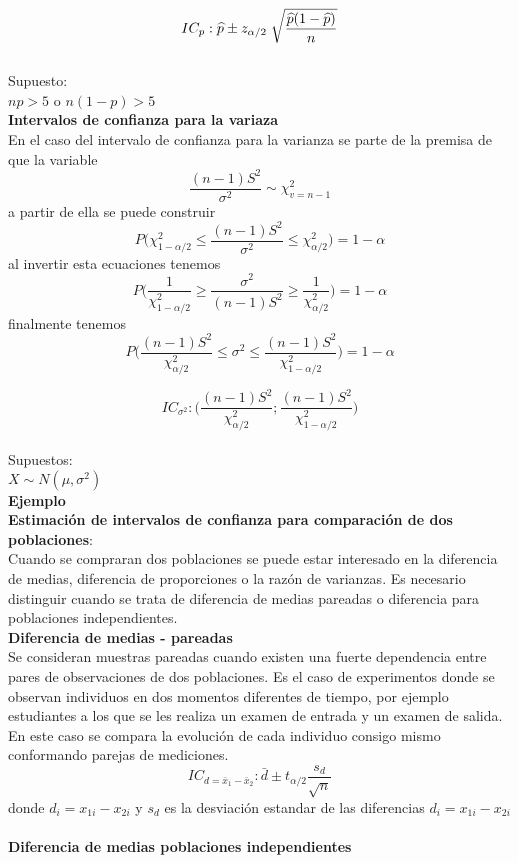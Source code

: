 \documentclass[base=hide,12pt]{elegantbook}
\begin{document}
			$$IC_{p}: \widehat{p} \pm z_{\alpha/2} \hspace{.1cm}\sqrt{\frac{\widehat{p}(1-\widehat{p})}{n}} $$
			\\
			Supuesto:\\
			$np>5$ o $n(1-p)>5$\\
			

	
\textcolor{col4}{\bf \large Intervalos de confianza para la variaza}\\
	En el caso del intervalo de confianza para la varianza se parte de la premisa de que la variable
	$$\frac{(n-1)S^{2}}{\sigma^{2}} \sim \chi^{2}_{v=n-1}$$
	a partir de ella se puede construir
	$$P\Bigg(\chi^{2}_{1-\alpha/2} \leq \frac{(n-1)S^{2}}{\sigma^{2}} \leq \chi^{2}_{\alpha/2} \Bigg)=1-\alpha$$
	al invertir esta ecuaciones tenemos
	$$P\Bigg(\frac{1}{\chi^{2}_{1-\alpha/2}} \geq \frac{\sigma^{2}}{(n-1)S^{2}} \geq \frac{1}{\chi^{2}_{\alpha/2}} \Bigg)=1-\alpha$$
	finalmente tenemos
	$$P\Bigg( \frac{(n-1)S^{2}}{\chi^{2}_{\alpha/2}} \leq \sigma^{2} \leq \frac{(n-1)S^{2}}{\chi^{2}_{1-\alpha/2}} \Bigg)=1-\alpha$$
	

			$$IC_{\sigma^{2}}: \Bigg( \displaystyle\frac{(n-1)S^{2}}{\chi^{2}_{\alpha/2}} ;\displaystyle\frac{(n-1)S^{2}}{\chi^{2}_{1-\alpha/2}} \Bigg)$$
			\\
			Supuestos:\\
			$X\sim N(\mu,\sigma^{2})$\\
			
\textcolor{col1}{\bf Ejemplo}\\	
	
\textcolor{col4}{\bf \large Estimación de intervalos de confianza para comparación de dos poblaciones}: \\
	Cuando se compraran dos poblaciones se puede estar interesado en la diferencia de medias, diferencia de proporciones o la razón de varianzas. Es necesario distinguir cuando se trata de diferencia de medias pareadas o diferencia para poblaciones independientes.\\
\textcolor{col4}{\bf \large Diferencia de medias - pareadas}\\
	Se consideran muestras pareadas cuando existen una fuerte dependencia entre pares de observaciones de dos poblaciones. Es el caso de experimentos donde se observan individuos en dos momentos diferentes de tiempo, por ejemplo estudiantes a los que se les realiza un examen de entrada y un examen de salida. En este caso se compara la evolución de cada individuo consigo mismo conformando parejas de mediciones.
	$$IC_{d=\bar{x}_{1}-\bar{x}_{2}}: \bar{d} \pm t_{\alpha/2} \frac{s_{d}}{\sqrt{n}}$$
	donde $d_{i}=x_{1i}-x_{2i}$ y $s_{d}$ es la desviación estandar de las diferencias $d_{i}=x_{1i}-x_{2i}$ \\ \\
\textcolor{col4}{\bf \large Diferencia de medias poblaciones independientes}\\
\end{document}
